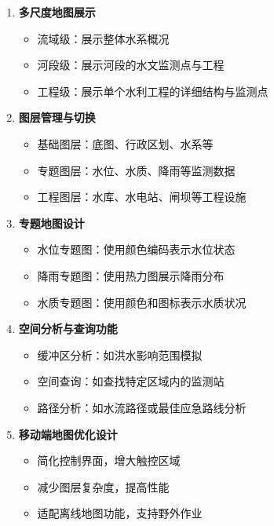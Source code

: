 \begin{enumerate}
\def\labelenumi{\arabic{enumi}.}
\tightlist
\item
  \textbf{多尺度地图展示}

  \begin{itemize}
  \tightlist
  \item
    流域级：展示整体水系概况
  \item
    河段级：展示河段的水文监测点与工程
  \item
    工程级：展示单个水利工程的详细结构与监测点
  \end{itemize}
\item
  \textbf{图层管理与切换}

  \begin{itemize}
  \tightlist
  \item
    基础图层：底图、行政区划、水系等
  \item
    专题图层：水位、水质、降雨等监测数据
  \item
    工程图层：水库、水电站、闸坝等工程设施
  \end{itemize}
\item
  \textbf{专题地图设计}

  \begin{itemize}
  \tightlist
  \item
    水位专题图：使用颜色编码表示水位状态
  \item
    降雨专题图：使用热力图展示降雨分布
  \item
    水质专题图：使用颜色和图标表示水质状况
  \end{itemize}
\item
  \textbf{空间分析与查询功能}

  \begin{itemize}
  \tightlist
  \item
    缓冲区分析：如洪水影响范围模拟
  \item
    空间查询：如查找特定区域内的监测站
  \item
    路径分析：如水流路径或最佳应急路线分析
  \end{itemize}
\item
  \textbf{移动端地图优化设计}

  \begin{itemize}
  \tightlist
  \item
    简化控制界面，增大触控区域
  \item
    减少图层复杂度，提高性能
  \item
    适配离线地图功能，支持野外作业
  \end{itemize}
\end{enumerate}

